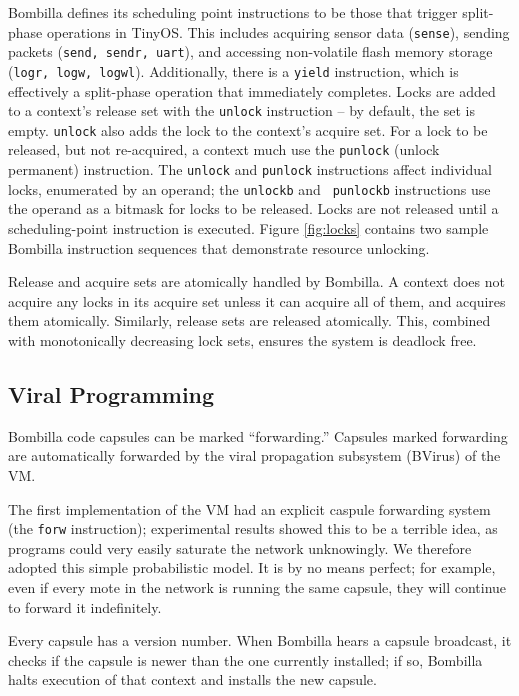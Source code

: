 \documentclass[10pt]{article}
\newcommand{\bomb}{Bombilla\xspace}
\begin{document}
\bomb defines its scheduling point instructions to be those that
trigger split-phase operations in TinyOS. This includes acquiring
sensor data ({\tt sense}), sending packets ({\tt send, sendr, uart}),
and accessing non-volatile flash memory storage ({\tt logr, logw,
logwl}). Additionally, there is a {\tt yield} instruction, which is
effectively a split-phase operation that immediately completes. Locks
are added to a context's release set with the {\tt unlock} instruction
-- by default, the set is empty. {\tt unlock} also adds the lock to
the context's acquire set. For a lock to be released, but not
re-acquired, a context much use the {\tt punlock} (unlock permanent)
instruction. The {\tt unlock} and {\tt punlock} instructions affect
individual locks, enumerated by an operand; the {\tt unlockb} and {\tt
punlockb} instructions use the operand as a bitmask for locks to be
released. Locks are not released until a scheduling-point instruction
is executed. Figure \ref{fig:locks} contains two sample \bomb
instruction sequences that demonstrate resource unlocking.

Release and acquire sets are atomically handled by \bomb. A
context does not acquire any locks in its acquire set unless it can
acquire all of them, and acquires them atomically. Similarly, release
sets are released atomically. This, combined with monotonically
decreasing lock sets, ensures the system is deadlock free.

\subsection{Viral Programming}
\label{sec:viral}


\bomb code capsules can be marked ``forwarding.'' Capsules marked
forwarding are automatically forwarded by the viral propagation
subsystem (BVirus) of the VM.


The first implementation of the VM had an explicit caspule forwarding
system (the {\tt forw} instruction); experimental results showed this
to be a terrible idea, as programs could very easily saturate the
network unknowingly. We therefore adopted this simple probabilistic
model. It is by no means perfect; for example, even if every mote in
the network is running the same capsule, they will continue to forward
it indefinitely.

Every capsule has a version number. When \bomb hears a capsule
broadcast, it checks if the capsule is newer than the one currently
installed; if so, \bomb halts execution of that context and
installs the new capsule.
\end{document}

